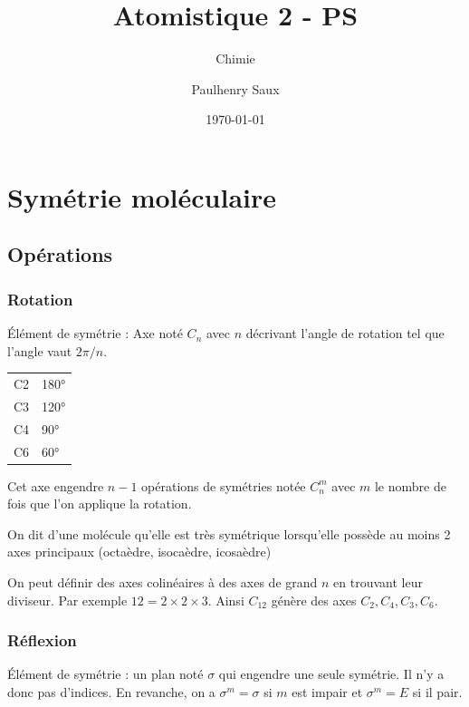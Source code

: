 \documentclass[french]{yLectureNote}
\title{Atomistique 2 - PS}
\subtitle{Chimie}
\author{Paulhenry Saux}
\date{\today}
\begin{document}
\setcounter{chapter}{3}
\chapter{Symétrie moléculaire}
\section{Opérations}
\subsection{Rotation}
Élément de symétrie : Axe noté \(C_n\) avec \(n\) décrivant l'angle de rotation tel que l'angle vaut \(2\pi/n\).

\begin{tabular}{ll}
C2 & 180°\\
C3 & 120°\\
C4 & 90°\\
C6 & 60°
                     \end{tabular}

Cet axe engendre \(n-1\) opérations de symétries notée \(C_n^m\) avec \(m\) le nombre de fois que l'on applique la rotation.
\begin{definition}
On dit d'une molécule qu'elle est très symétrique lorsqu'elle possède au moins 2 axes principaux (octaèdre, isocaèdre, icosaèdre)
\end{definition}
On peut définir des axes colinéaires à des axes de grand \(n\) en trouvant leur diviseur. Par exemple \(12 = 2\times 2 \times 3\). Ainsi \(C_{12}\) génère des axes \(C_2,C_4,C_3, C_6\).
\subsection{Réflexion}
Élément de symétrie : un plan noté \(\sigma\) qui engendre une seule symétrie. Il n'y a donc pas d'indices. En revanche, on a \(\sigma^m = \sigma\) si \(m\) est impair et \(\sigma^m =E\) si il pair.
\end{document}
